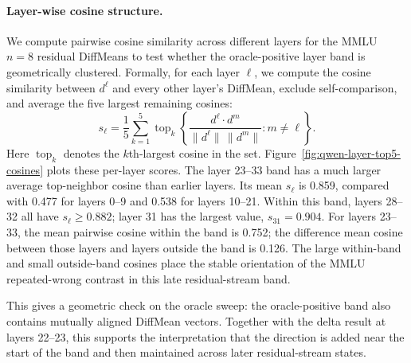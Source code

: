 \paragraph{Layer-wise cosine structure.}
We compute pairwise cosine similarity across different layers for the MMLU $n=8$ residual DiffMeans to
test whether the oracle-positive layer band is geometrically clustered.
Formally, for each layer $\ell$, we compute the cosine similarity between
$d^\ell$ and every other layer's DiffMean, exclude self-comparison, and
average the five largest remaining cosines:
\[
  s_\ell =
  \frac{1}{5}\sum_{k=1}^{5}
  \operatorname{top}_k
  \left\{
    \frac{d^\ell \cdot d^m}{\|d^\ell\|\,\|d^m\|}
    : m \neq \ell
  \right\}.
\]
Here $\operatorname{top}_k$ denotes the $k$th-largest cosine in the set.
Figure~\ref{fig:qwen-layer-top5-cosines} plots these per-layer scores. The
layer 23--33 band has a much larger average top-neighbor cosine than earlier
layers. Its mean $s_\ell$ is 0.859, compared with 0.477 for layers 0--9 and
0.538 for layers 10--21. Within this band, layers 28--32 all have
$s_\ell \geq 0.882$; layer 31 has the largest value, $s_{31}=0.904$.
For layers 23--33, the mean pairwise cosine within the band is 0.752; the difference mean
cosine between those layers and layers outside the band is 0.126. The large
within-band and small outside-band cosines place the stable orientation of the
MMLU repeated-wrong contrast in this late residual-stream band.

This gives a geometric check on the oracle sweep: the oracle-positive band also
contains mutually aligned DiffMean vectors. Together with the delta result at
layers 22--23, this supports the interpretation that the direction is added near
the start of the band and then maintained across later residual-stream states.

